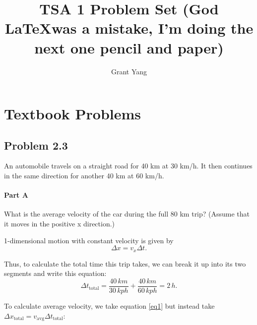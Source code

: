 \documentclass[12pt]{article}
\begin{document}
 
%
%
 
\title{TSA 1 Problem Set (God \LaTeX was a mistake, I'm doing the next one pencil and paper)} %
\author{Grant Yang} %
\maketitle

\tableofcontents
\newpage

\section{Textbook Problems}
 
\subsection{Problem 2.3}
An automobile travels on a straight road for
40 km at 30 km/h. It then continues in the same direction for another 40 km at 60 km/h.

\paragraph{Part A} 
What is the average velocity of the car during the full 80 km trip? (Assume that it moves in the positive x direction.) \newline

1-dimensional motion with constant velocity is given by \begin{equation}\Delta x = v_x \Delta t. \label{eq1}\end{equation}

Thus, to calculate the total time this trip takes, we can break it up into its two segments and write this equation:
\[\Delta t_\text{total} = \frac{40\,\si{km}}{30\,\si{kph}} + \frac{40\,\si{km}}{60\,\si{kph}} = 2\,\si{h}.\]

To calculate average velocity, we take equation \eqref{eq1} but instead take $\Delta x_\text{total} = v_\text{avg} \Delta t_\text{total}$:
\end{document}

